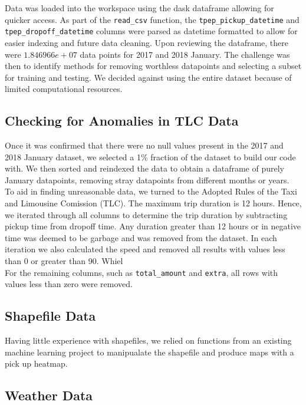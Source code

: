 \documentclass[journal]{IEEEtran}
\newcommand{\cc}[1]{\texttt{#1}}
\begin{document}
\noindent Data was loaded into the workspace using the dask dataframe allowing for quicker access. As part of the \cc{read\_csv} function, the  \cc{tpep\_pickup\_datetime} and \cc{tpep\_dropoff\_datetime} columns were parsed as datetime formatted to allow for easier indexing and future data cleaning. Upon reviewing the dataframe, there were $1.846966e+07$ data points for 2017 and 2018 January. The challenge was then to identify methods for removing worthless datapoints and selecting a subset for training and testing. We decided against using the entire dataset because of limited computational resources. 

\subsection{Checking for Anomalies in TLC Data}

\noindent Once it was confirmed that there were no null values present in the 2017 and 2018 January dataset, we selected a {\color{red} 1\% fraction} of the dataset to build our code with. We then sorted and reindexed the data to obtain a dataframe of purely January datapoints, removing stray datapoints from different months or years.\\

\noindent To aid in finding unreasonable data, we turned to the Adopted Rules of the Taxi and Limousine Comission (TLC). The maximum trip duration is 12 hours. Hence, we iterated through all columns to determine the trip duration by subtracting pickup time from dropoff time. Any duration greater than 12 hours {\color{blue} or in negative time} was deemed to be garbage and was removed from the dataset. In each iteration we also calculated the speed and removed all results with values less than 0 or greater than 90. Whiel\\

\noindent For the remaining columns, such as \cc{total\_amount} and \cc{extra}, all rows with values less than zero were removed. 

\subsection{Shapefile Data}

\noindent Having little experience with shapefiles, we relied on functions from an existing machine learning project \cite{shapefile} to manipualate the shapefile and produce maps with a pick up heatmap. 

\subsection{Weather Data}
\end{document}
